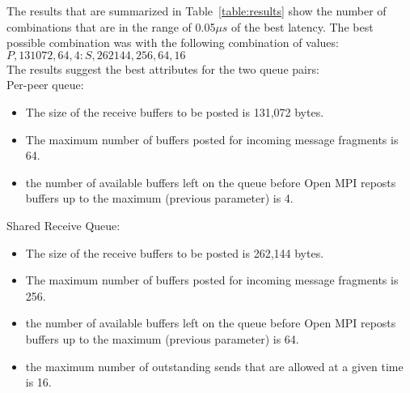 The results that are summarized in Table~\ref{table:results} show the number
of combinations that are in the range of 0.05$\mu s$ of the best
latency. The best possible combination was with the following combination of values:
$P,131072,64,4:S,262144,256,64,16$\\
The results suggest the best attributes for the two queue pairs:\\
Per-peer queue:
\begin{itemize}
\item The size of the receive buffers to be posted is 131,072 bytes.
\item The maximum number of buffers posted for incoming message fragments is
  64.
\item the number of available buffers left on the queue before Open MPI
  reposts buffers up to the maximum (previous parameter) is 4.
\end{itemize}
Shared Receive Queue:
\begin{itemize}
\item The size of the receive buffers to be posted is 262,144 bytes.
\item The maximum number of buffers posted for incoming message fragments is
  256.
\item the number of available buffers left on the queue before Open MPI
  reposts buffers up to the maximum (previous parameter) is 64.
\item the maximum number of outstanding sends that are allowed at a given time
  is 16.
\end{itemize}


